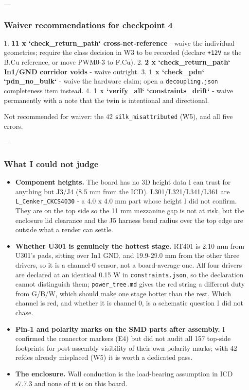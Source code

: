 \documentclass[11pt,a4paper]{article}
\begin{document}
---

\subsubsection*{Waiver recommendations for checkpoint 4}
1. \textbf{11 x `check\_return\_path` cross-net-reference} - waive the individual geometries; require the class decision in W3 to be recorded (declare \texttt{+12V} as the B.Cu reference, or move PWM0-3 to F.Cu). 2. \textbf{2 x `check\_return\_path` In1/GND corridor voids} - waive outright. 3. \textbf{1 x `check\_pdn` `pdn\_no\_bulk`} - waive the hardware claim; open a \texttt{decoupling.json} completeness item instead. 4. \textbf{1 x `verify\_all` `constraints\_drift`} - waive permanently with a note that the twin is intentional and directional.

Not recommended for waiver: the 42 \texttt{silk\_misattributed} (W5), and all five errors.

---

\subsubsection*{What I could not judge}
\begin{itemize}
\item \textbf{Component heights.} The board has no 3D height data I can trust for
anything but J3/J4 (8.5 mm from the ICD). L301/L321/L341/L361 are
\texttt{L\_Cenker\_CKCS4030} - a 4.0 x 4.0 mm part whose height I did not confirm.
They are on the top side so the 11 mm mezzanine gap is not at risk, but the
enclosure lid clearance and the J5 harness bend radius over the top edge are
outside what a render can settle.
\item \textbf{Whether U301 is genuinely the hottest stage.} RT401 is 2.10 mm from
U301's pads, sitting over In1 GND, and 19.9-29.0 mm from the other three
drivers, so it is a channel-0 sensor, not a board-average one. All four
drivers are declared at an identical 0.15 W in \texttt{constraints.json}, so the
declaration cannot distinguish them; \texttt{power\_tree.md} gives the red string a
different duty from G/B/W, which should make one stage hotter than the rest.
Which channel is red, and whether it is channel 0, is a schematic question I
did not chase.
\item \textbf{Pin-1 and polarity marks on the SMD parts after assembly.} I confirmed
the connector markers (E4) but did not audit all 157 top-side footprints for
post-assembly visibility of their own polarity marks; with 42 refdes already
misplaced (W5) it is worth a dedicated pass.
\item \textbf{The enclosure.} Wall conduction is the load-bearing assumption in ICD
s7.7.3 and none of it is on this board.
\end{itemize}
\end{document}
